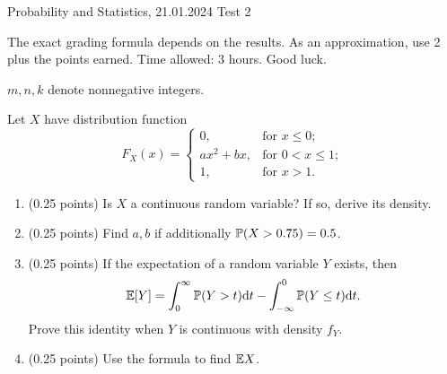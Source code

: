 \documentclass[a4paper]{report}
\begin{document}
\noindent Probability and Statistics, 21.01.2024 \hfill Test 2

\hrulefill

\begin{it}
The exact grading formula depends on the results. As an approximation, use 2 plus the points earned. Time allowed: 3 hours. Good luck.

$m,n,k$ denote nonnegative integers.



\end{it}

\begin{problem}
    Let $X$ have distribution function
\[
F_X(x) = \begin{cases}
    0, & \text{for }x\leq0;\\
    ax^2+bx, & \text{for }0<x\leq1;\\
    1, & \text{for }x>1.
\end{cases}
\]
    \begin{enumerate}
        \item (0.25 points) Is $X$ a continuous random variable? If so, derive its density.
        \item (0.25 points) Find $a,b$ if additionally $\P(X>0.75)=0.5$.
        \item (0.25 points) If the expectation of a random variable $Y$ exists, then
        \[\mathbb{E}[Y]=\int_0^\infty\mathbb{P}(Y>t)\D t-\int_{-\infty}^0\mathbb{P}(Y\leq t)\D t.\]
        Prove this identity when $Y$ is continuous with density $f_Y$.
        \item (0.25 points) Use the formula to find $\E X$.
    \end{enumerate}
\end{problem}
\end{document}
